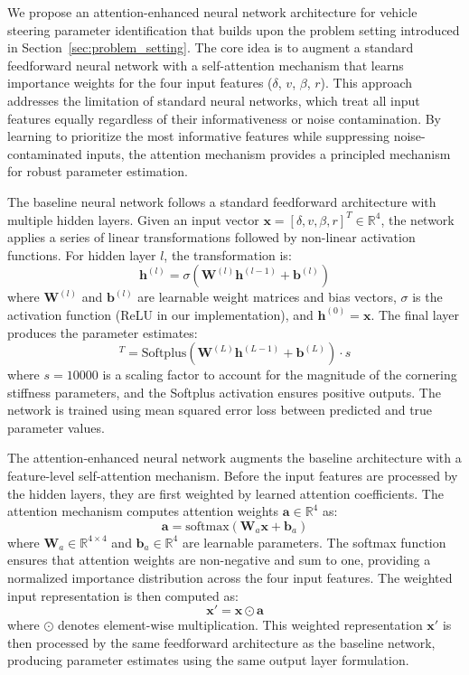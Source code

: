 \documentclass[Afour,sageh,times]{sagej}
\begin{document}
We propose an attention-enhanced neural network architecture for vehicle steering parameter identification that builds upon the problem setting introduced in Section~\ref{sec:problem_setting}. The core idea is to augment a standard feedforward neural network with a self-attention mechanism that learns importance weights for the four input features ($\delta$, $v$, $\beta$, $r$). This approach addresses the limitation of standard neural networks, which treat all input features equally regardless of their informativeness or noise contamination. By learning to prioritize the most informative features while suppressing noise-contaminated inputs, the attention mechanism provides a principled mechanism for robust parameter estimation.

The baseline neural network follows a standard feedforward architecture with multiple hidden layers. Given an input vector $\mathbf{x} = [\delta, v, \beta, r]^T \in \mathbb{R}^4$, the network applies a series of linear transformations followed by non-linear activation functions. For hidden layer $l$, the transformation is:
\begin{equation}
\mathbf{h}^{(l)} = \sigma(\mathbf{W}^{(l)} \mathbf{h}^{(l-1)} + \mathbf{b}^{(l)})
\end{equation}
where $\mathbf{W}^{(l)}$ and $\mathbf{b}^{(l)}$ are learnable weight matrices and bias vectors, $\sigma$ is the activation function (ReLU in our implementation), and $\mathbf{h}^{(0)} = \mathbf{x}$. The final layer produces the parameter estimates:
\begin{equation}
[\hat{C}_f, \hat{C}_r]^T = \text{Softplus}(\mathbf{W}^{(L)} \mathbf{h}^{(L-1)} + \mathbf{b}^{(L)}) \cdot s
\end{equation}
where $s = 10000$ is a scaling factor to account for the magnitude of the cornering stiffness parameters, and the Softplus activation ensures positive outputs. The network is trained using mean squared error loss between predicted and true parameter values.

The attention-enhanced neural network augments the baseline architecture with a feature-level self-attention mechanism. Before the input features are processed by the hidden layers, they are first weighted by learned attention coefficients. The attention mechanism computes attention weights $\mathbf{a} \in \mathbb{R}^4$ as:
\begin{equation}
\mathbf{a} = \text{softmax}(\mathbf{W}_a \mathbf{x} + \mathbf{b}_a)
\end{equation}
where $\mathbf{W}_a \in \mathbb{R}^{4 \times 4}$ and $\mathbf{b}_a \in \mathbb{R}^4$ are learnable parameters. The softmax function ensures that attention weights are non-negative and sum to one, providing a normalized importance distribution across the four input features. The weighted input representation is then computed as:
\begin{equation}
\mathbf{x}' = \mathbf{x} \odot \mathbf{a}
\end{equation}
where $\odot$ denotes element-wise multiplication. This weighted representation $\mathbf{x}'$ is then processed by the same feedforward architecture as the baseline network, producing parameter estimates using the same output layer formulation.
\end{document}
